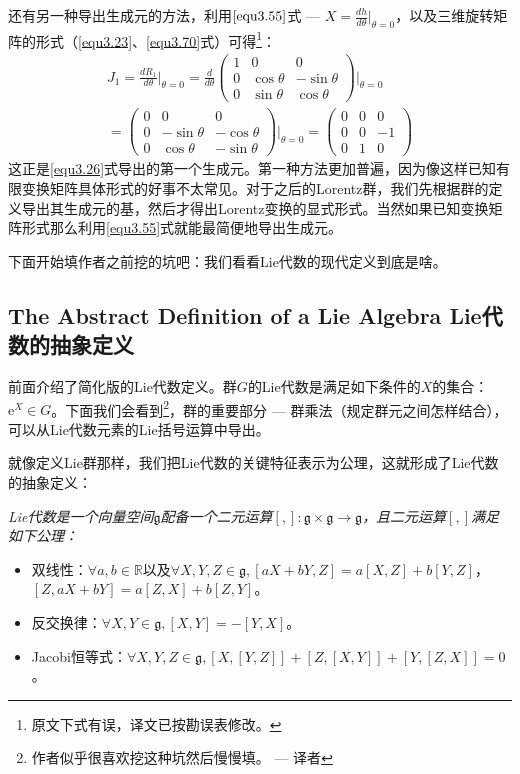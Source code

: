 还有另一种导出生成元的方法，利用$\eqref{equ3.55}$式 --- $X = \frac{dh}{d\theta}\big|_{\theta = 0}$，以及三维旋转矩阵的形式（\eqref{equ3.23}、\eqref{equ3.70}式）可得\footnote{原文下式有误，译文已按勘误表修改。}：
\begin{multline}
\label{equ3.74}
J_1 = \frac{dR_1}{d\theta} \bigg|_{\theta = 0} = \frac{d}{d\theta}
	\begin{pmatrix}
		1 & 0 & 0 \\
		0 & \cos \theta & -\sin \theta \\
		0 & \sin \theta & \cos \theta
	\end{pmatrix}
\Bigg|_{\theta = 0} \\
= 	\begin{pmatrix}
		0 & 0 & 0 \\
		0 & -\sin \theta & -\cos \theta \\
		0 & \cos \theta & -\sin \theta
	\end{pmatrix}
\Bigg|_{\theta = 0}
=	\begin{pmatrix}
		0 & 0 & 0 \\
		0 & 0 & -1 \\
		0 & 1 & 0
	\end{pmatrix}
\end{multline}
这正是\eqref{equ3.26}式导出的第一个生成元。第一种方法更加普遍，因为像这样已知有限变换矩阵具体形式的好事不太常见。对于之后的Lorentz群，我们先根据群的定义导出其生成元的基，然后才得出Lorentz变换的显式形式。当然如果已知变换矩阵形式那么利用\eqref{equ3.55}式就能最简便地导出生成元。

下面开始填作者之前挖的坑吧：我们看看Lie代数的现代定义到底是啥。

\subsection[Lie代数的抽象定义]{The Abstract Definition of a Lie Algebra \quad Lie代数的抽象定义}
\label{sec3.4.2}
前面介绍了简化版的Lie代数定义。群$G$的Lie代数是满足如下条件的$X$的集合：$\mathrm{e}^{X} \in G$。下面我们会看到\footnote{作者似乎很喜欢挖这种坑然后慢慢填。 --- 译者}，群的重要部分 --- 群乘法（规定群元之间怎样结合），可以从Lie代数元素的Lie括号运算中导出。

就像定义Lie群那样，我们把Lie代数的关键特征表示为公理，这就形成了Lie代数的抽象定义：

{\it
Lie代数是一个向量空间$\mathfrak{g}$配备一个二元运算$[,]: \mathfrak{g} \times \mathfrak{g} \rightarrow \mathfrak{g}$，且二元运算$[,]$满足如下公理：
\begin{itemize}
	\item 双线性：$\forall a, b \in \mathbb{R} \text{以及} \forall X, Y, Z \in \mathfrak{g}, [aX + bY, Z] = a[X, Z] + b[Y, Z]$，$[Z, aX + bY] = a[Z, X] + b[Z, Y]$。
	\item 反交换律：$\forall X, Y \in \mathfrak{g}, [X, Y] = -[Y, X]$。
	\item Jacobi恒等式：$\forall X, Y, Z \in \mathfrak{g}, [X, [Y, Z]] + [Z, [X, Y]] + [Y, [Z, X]] = 0$。
\end{itemize}
}

